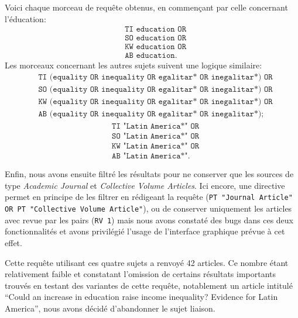 \documentclass[pagesize, twoside=off, bibliography=totoc, DIV=calc, fontsize=12pt, a4paper, french]{scrartcl}
\begin{document}
Voici chaque morceau de requête obtenus, en commençant par celle concernant l’éducation:
\begin{equation}
  \label{eq:education}
  \left.\begin{aligned}
    &\texttt{TI education OR}\\ 
    &\texttt{SO education OR}\\ 
    &\texttt{KW education OR}\\ 
    &\texttt{AB education}.
  \end{aligned}\right.
\end{equation}
Les morceaux concernant les autres sujets suivent une logique similaire:
\begin{equation}
  \label{eq:equality}
  \left.\begin{aligned}
    &\texttt{TI (equality OR inequality OR egalitar* OR inegalitar*) OR}\\ 
    &\texttt{SO (equality OR inequality OR egalitar* OR inegalitar*) OR}\\ 
    &\texttt{KW (equality OR inequality OR egalitar* OR inegalitar*) OR}\\ 
    &\texttt{AB (equality OR inequality OR egalitar* OR inegalitar*)};
  \end{aligned}\right.
\end{equation}
\begin{equation}
  \label{eq:latin}
  \left.\begin{aligned}
    &\texttt{TI "Latin America*" OR}\\ 
    &\texttt{SO "Latin America*" OR}\\ 
    &\texttt{KW "Latin America*" OR}\\ 
    &\texttt{AB "Latin America*"}.
  \end{aligned}\right.
\end{equation}

Enfin, nous avons ensuite filtré les résultats pour ne conserver que les sources de type \emph{Academic Journal} et \emph{Collective Volume Articles}. Ici encore, une directive permet en principe de les filtrer en rédigeant la requête (\texttt{PT "Journal Article" OR PT "Collective Volume Article"}), ou de conserver uniquement les articles avec revue par les pairs (\texttt{RV 1}) mais nous avons constaté des bugs dans ces deux fonctionnalités et avons privilégié l’usage de l’interface graphique prévue à cet effet.

Cette requête utilisant ces quatre sujets a renvoyé 42 articles. Ce nombre étant relativement faible et constatant l’omission de certains résultats importants trouvés en testant des variantes de cette requête, notablement un article intitulé “Could an increase in education raise income inequality? Evidence for Latin America”, nous avons décidé d’abandonner le sujet \og{}liaison\fg{}.
\end{document}
